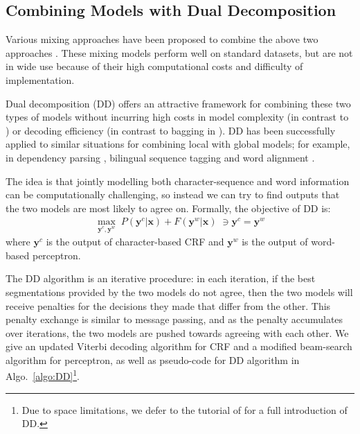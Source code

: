 \subsection{Combining Models with Dual Decomposition} 
Various mixing approaches have been proposed to combine the above two approaches \cite{Wang:2006:SIGHAN,Lin:2009:CICLing,Sun:2009:HLT-NAACL,Sun:2010:COLING,Wang:2010:COLING}. 
These mixing models perform well on standard datasets, but are not in wide use because of their high computational costs and difficulty of implementation.

Dual decomposition (DD) \cite{Rush:2010:EMNLP} offers an attractive framework for combining these two types of models without incurring high costs in model complexity (in contrast to \cite{Sun:2009:HLT-NAACL}) or decoding efficiency (in contrast to bagging in \cite{Wang:2006:SIGHAN,Sun:2010:COLING}). DD has been successfully applied to similar situations for combining local with global models; for example, in dependency parsing \cite{Koo:2010:EMNLP}, bilingual sequence tagging \cite{Wang:2013:ACL} and word alignment \cite{Denero:2011:ACL}.  

The idea is that jointly modelling both character-sequence and word information can be computationally challenging, so instead we can try to find outputs that the two models are most likely to agree on.
Formally, the objective of DD is:
\begin{align*}
   \max_{\mathbf{y^\textit{c}}, \mathbf{y^\textit{w}}}  \; P(\mathbf{y^\textit{c}} | \mathbf{x}) + F(\mathbf{y^\textit{w}} | \mathbf{x}) \;  \ni \mathbf{y^\textit{c}} = \mathbf{y^\textit{w}}
\end{align*}
\noindent where $\mathbf{y^\textit{c}}$ is the output of character-based CRF and $\mathbf{y^\textit{w}}$ is the output of word-based perceptron.

The DD algorithm is an iterative procedure: in each iteration, if the best segmentations provided by the two models do not agree, then the two models will receive penalties for the decisions they made that differ from the other. This penalty exchange is similar to message passing, and as the penalty accumulates over iterations, the two models are pushed towards agreeing with each other. We give an updated Viterbi decoding algorithm for CRF and a modified beam-search algorithm for perceptron, as well as pseudo-code for DD algorithm in Algo.~\ref{algo:DD}\footnote{Due to space limitations, we defer to the tutorial of  for a full introduction of DD.}.


